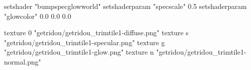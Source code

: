 setshader "bumpspecglowworld"
setshaderparam "specscale" 0.5
setshaderparam "glowcolor" 0.0 0.0 0.0

texture 0 "getridou/getridou_trimtile1-diffuse.png"
texture s "getridou/getridou_trimtile1-specular.png"
texture g "getridou/getridou_trimtile1-glow.png"
texture n "getridou/getridou_trimtile1-normal.png"
